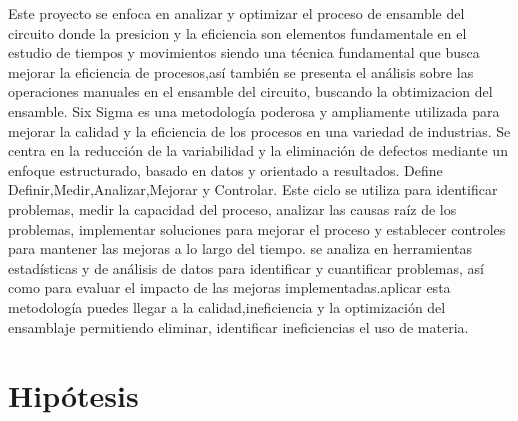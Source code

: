     Este proyecto se enfoca en analizar y optimizar el proceso de ensamble del circuito  donde la presicion y la eficiencia  son elementos fundamentale en el estudio de tiempos y movimientos siendo una técnica fundamental que busca mejorar la eficiencia de procesos,así también se presenta el análisis sobre las operaciones manuales en el ensamble del circuito, buscando la obtimizacion del ensamble.
    Six Sigma es una metodología poderosa y ampliamente utilizada para mejorar la calidad y la eficiencia de los procesos en una variedad de industrias. Se centra en la reducción de la variabilidad y la eliminación de defectos mediante un enfoque estructurado, basado en datos y orientado a resultados.
    Define Definir,Medir,Analizar,Mejorar y Controlar. Este ciclo se utiliza para identificar problemas, medir la capacidad del proceso, analizar las causas raíz de los problemas, implementar soluciones para mejorar el proceso y establecer controles para mantener las mejoras a lo largo del tiempo.
    se analiza en herramientas estadísticas y de análisis de datos para identificar y cuantificar problemas, así como para evaluar el impacto de las mejoras implementadas.aplicar esta metodología puedes llegar a la calidad,ineficiencia y la optimización del ensamblaje permitiendo eliminar, identificar ineficiencias el uso de materia.
    \section{Hipótesis}
    
